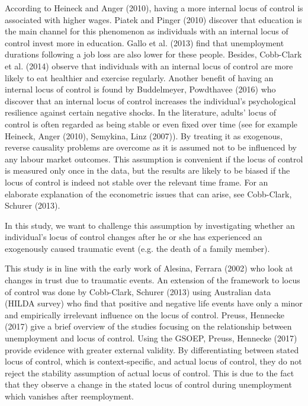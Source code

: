 \documentclass[12pt, a4paper, fleqn, parskip]{scrartcl}
\begin{document}
According to Heineck and Anger (2010), having a more internal locus of control
is associated with higher wages. Piatek and Pinger (2010) discover that
education is the main channel for this phenomenon as individuals with an
internal locus of control invest more in education. Gallo et al. (2013) find
that unemployment durations following a job loss are also lower for these
people. Besides, Cobb-Clark et al. (2014) observe that individuals with an
internal locus of control are more likely to eat healthier and exercise
regularly. Another benefit of having an internal locus of control is found by
Buddelmeyer, Powdthavee (2016) who discover that an internal locus of control
increases the individual's psychological resilience against certain negative
shocks. In the literature, adults' locus of control is often regarded as being
stable or even fixed over time (see for example Heineck, Anger (2010),
Semykina, Linz (2007)). By treating it as exogenous, reverse causality problems
are overcome as it is assumed not to be influenced by any labour market
outcomes. This assumption is convenient if the locus of control is measured
only once in the data, but the results are likely to be biased if the locus of
control is indeed not stable over the relevant time frame. For an elaborate
explanation of the econometric issues that can arise, see Cobb-Clark, Schurer
(2013).

In this study, we want to challenge this assumption by investigating whether an
individual's locus of control changes after he or she has experienced an
exogenously caused traumatic event (e.g. the death of a family member).

This study is in line with the early work of Alesina, Ferrara (2002) who look
at changes in trust due to traumatic events. An extension of the framework to
locus of control was done by Cobb-Clark, Schurer (2013) using Australian data
(HILDA survey) who find that positive and negative life events have only a
minor and empirically irrelevant  influence on the locus of control. Preuss,
Hennecke (2017) give a brief overview of the studies focusing on the
relationship between unemployment and locus of control. Using the GSOEP,
Preuss, Hennecke (2017) provide evidence with greater external validity. By
differentiating between stated locus of control, which is context-specific, and
actual locus of control, they do not reject the stability assumption of actual
locus of control. This is due to the fact that they observe a change in the
stated locus of control during unemployment which vanishes after reemployment.
\end{document}
